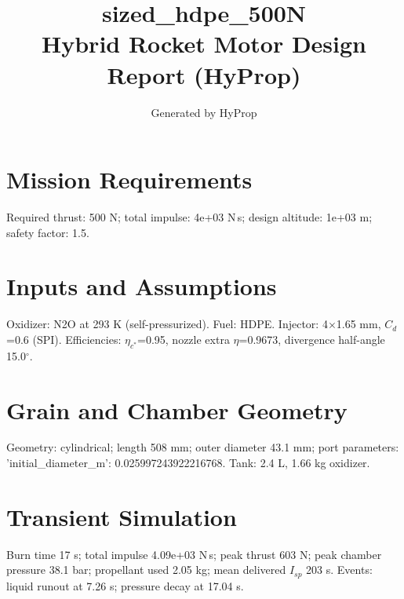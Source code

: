 \documentclass[11pt]{article}
\title{sized\_hdpe\_500N\\\large Hybrid Rocket Motor Design Report (HyProp)}
\author{Generated by HyProp}
\begin{document}
\maketitle
\section{Mission Requirements}
Required thrust: 500 N; total impulse: 4e+03 N\,s; design altitude: 1e+03 m; safety factor: 1.5.
\section{Inputs and Assumptions}
Oxidizer: N2O at 293 K (self-pressurized). Fuel: HDPE. Injector: 4$\times$1.65 mm, $C_d$=0.6 (SPI). Efficiencies: $\eta_{c^*}$=0.95, nozzle extra $\eta$=0.9673, divergence half-angle 15.0$^\circ$.
\section{Grain and Chamber Geometry}
Geometry: cylindrical; length 508 mm; outer diameter 43.1 mm; port parameters: {'initial_diameter_m': 0.025997243922216768}. Tank: 2.4 L, 1.66 kg oxidizer.
\section{Transient Simulation}
Burn time 17 s; total impulse 4.09e+03 N\,s; peak thrust 603 N; peak chamber pressure 38.1 bar; propellant used 2.05 kg; mean delivered $I_{sp}$ 203 s. Events: liquid runout at 7.26 s; pressure decay at 17.04 s.
\end{document}
